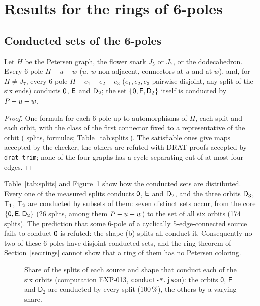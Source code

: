 \section{Results for the rings of 6-poles}\label{sec:results6}

\subsection{Conducted sets of the 6-poles}\label{sec:conducted}

\begin{proposition}[\claim{MV}]\label{prop:core}
Let $H$ be the Petersen graph, the flower snark $J_5$ or $J_7$, or the dodecahedron. Every 6-pole
$H - u - w$ ($u$, $w$ non-adjacent, connectors at $u$ and at $w$), and, for $H \ne J_7$, every
6-pole $H - e_1 - e_2 - e_3$ ($e_1, e_2, e_3$ pairwise disjoint, any split of the six ends) conducts
$\mathsf{0}$, $\mathsf{E}$ and $\mathsf{D}_2$; the set $\{\mathsf{0}, \mathsf{E}, \mathsf{D}_2\}$
itself is conducted by $P - u - w$.
\end{proposition}

\begin{proof}
One formula for each 6-pole up to automorphisms of $H$, each split and each orbit, with the class of
the first connector fixed to a representative of the orbit (\nSplits{} splits, \nFormulasSix{} formulas; Table~\ref{tab:splits}). The
satisfiable ones give maps accepted by the checker, the others are refuted with DRAT proofs
accepted by \texttt{drat-trim}; none of the four graphs has a cycle-separating cut of at most four
edges.
\end{proof}



Table~\ref{tab:splits} and Figure~\ref{fig:conducted} show how the conducted sets are distributed. Every one of the
\nSplits{} measured splits conducts $\mathsf{0}$, $\mathsf{E}$ and $\mathsf{D}_2$, and the three orbits $\mathsf{D}_3$, $\mathsf{T}_1$, $\mathsf{T}_2$ are conducted by
subsets of them: seven distinct sets occur, from the core $\{\mathsf{0},\mathsf{E},\mathsf{D}_2\}$ (26 splits, among them $P - u - w$) to the set of all six orbits
(174 splits). The prediction that some 6-pole of a cyclically 5-edge-connected source fails to conduct $\mathsf{0}$ is refuted: the \nSplitsB{}
shape-(b) splits all conduct it. Consequently no two of these 6-poles have disjoint conducted sets, and the ring theorem of
Section~\ref{sec:rings} cannot show that a ring of them has no Petersen coloring.

\begin{figure}[t]\centering

\caption{Share of the splits of each source and shape that conduct each of the six orbits (computation EXP-013, \texttt{conduct-*.json}): the orbits
$\mathsf{0}$, $\mathsf{E}$ and $\mathsf{D}_2$ are conducted by every split (100\,\%), the others by a varying share.}\label{fig:conducted}
\end{figure}

